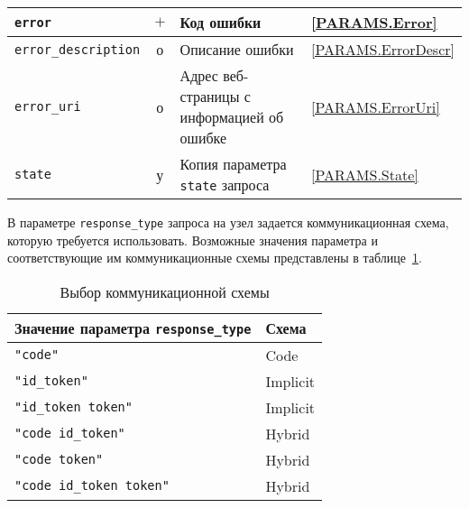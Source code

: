 \begin{table}[p]
\begin{tabular}{|l|c|p{9.0cm}|l|}
\hline
\hline
%
\lstinline!error! & $+$ & 
Код ошибки & 
\ref{PARAMS.Error}\\
\hline
%
\lstinline!error_description! & о & 
Описание ошибки &
\ref{PARAMS.ErrorDescr}\\
\hline
%
\lstinline!error_uri! & о & 
Адрес веб-страницы с информацией об ошибке &
\ref{PARAMS.ErrorUri}\\
\hline
%
\lstinline!state! & у & 
Копия параметра \lstinline!state! запроса &  
\ref{PARAMS.State}\\
\hline
\end{tabular}
\end{table}

В параметре \lstinline{response_type} запроса на узел
задается коммуникационная схема, которую требуется использовать.
%
Возможные значения параметра и соответствующие им коммуникационные схемы 
представлены в таблице~\ref{Table.OIDC.RespType}.

\begin{table}[hbt]
\caption{Выбор коммуникационной схемы}\label{Table.OIDC.RespType}
\begin{tabular}{|l|l|}
\hline
Значение параметра \lstinline!response_type! & Схема\\
\hline
\hline
\lstinline!"code"! & Code\\
\lstinline!"id_token"! & Implicit\\
\lstinline!"id_token token"! & Implicit\\
\lstinline!"code id_token"! & Hybrid\\
\lstinline!"code token"! & Hybrid\\
\lstinline!"code id_token token"! & Hybrid\\
\hline
\end{tabular}
\end{table}

